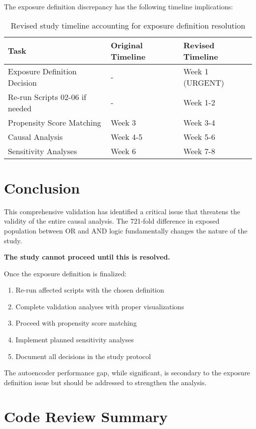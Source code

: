 \documentclass[11pt]{article}
\begin{document}
The exposure definition discrepancy has the following timeline implications:

\begin{table}[H]
\centering
\begin{tabular}{lll}
\toprule
\textbf{Task} & \textbf{Original Timeline} & \textbf{Revised Timeline} \\
\midrule
Exposure Definition Decision & - & Week 1 (URGENT) \\
Re-run Scripts 02-06 if needed & - & Week 1-2 \\
Propensity Score Matching & Week 3 & Week 3-4 \\
Causal Analysis & Week 4-5 & Week 5-6 \\
Sensitivity Analyses & Week 6 & Week 7-8 \\
\bottomrule
\end{tabular}
\caption{Revised study timeline accounting for exposure definition resolution}
\label{tab:timeline}
\end{table}

\section{Conclusion}

This comprehensive validation has identified a critical issue that threatens the validity of the entire causal analysis. The 721-fold difference in exposed population between OR and AND logic fundamentally changes the nature of the study. 

\textbf{The study cannot proceed until this is resolved.}

Once the exposure definition is finalized:
\begin{enumerate}
    \item Re-run affected scripts with the chosen definition
    \item Complete validation analyses with proper visualizations
    \item Proceed with propensity score matching
    \item Implement planned sensitivity analyses
    \item Document all decisions in the study protocol
\end{enumerate}

The autoencoder performance gap, while significant, is secondary to the exposure definition issue but should be addressed to strengthen the analysis.

\appendix

\section{Code Review Summary}
\end{document}

